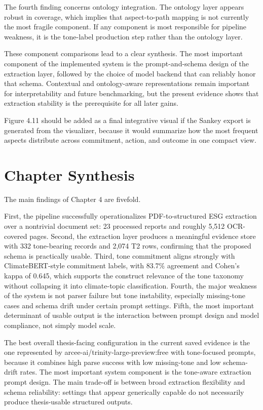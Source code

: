 The fourth finding concerns ontology integration. The ontology layer appears robust in coverage, which implies that aspect-to-path mapping is not currently the most fragile component. If any component is most responsible for pipeline weakness, it is the tone-label production step rather than the ontology layer.

These component comparisons lead to a clear synthesis. The most important component of the implemented system is the prompt-and-schema design of the extraction layer, followed by the choice of model backend that can reliably honor that schema. Contextual and ontology-aware representations remain important for interpretability and future benchmarking, but the present evidence shows that extraction stability is the prerequisite for all later gains.

Figure 4.11 should be added as a final integrative visual if the Sankey export is generated from the visualizer, because it would summarize how the most frequent aspects distribute across commitment, action, and outcome in one compact view.

\section{Chapter Synthesis}

The main findings of Chapter 4 are fivefold.

First, the pipeline successfully operationalizes PDF-to-structured ESG extraction over a nontrivial document set: 23 processed reports and roughly 5,512 OCR-covered pages. Second, the extraction layer produces a meaningful evidence store with 332 tone-bearing records and 2,074 T2 rows, confirming that the proposed schema is practically usable. Third, tone commitment aligns strongly with ClimateBERT-style commitment labels, with 83.7\% agreement and Cohen’s kappa of 0.645, which supports the construct relevance of the tone taxonomy without collapsing it into climate-topic classification. Fourth, the major weakness of the system is not parser failure but tone instability, especially missing-tone cases and schema drift under certain prompt settings. Fifth, the most important determinant of usable output is the interaction between prompt design and model compliance, not simply model scale.

The best overall thesis-facing configuration in the current saved evidence is the one represented by arcee-ai/trinity-large-preview:free with tone-focused prompts, because it combines high parse success with low missing-tone and low schema-drift rates. The most important system component is the tone-aware extraction prompt design. The main trade-off is between broad extraction flexibility and schema reliability: settings that appear generically capable do not necessarily produce thesis-usable structured outputs.

